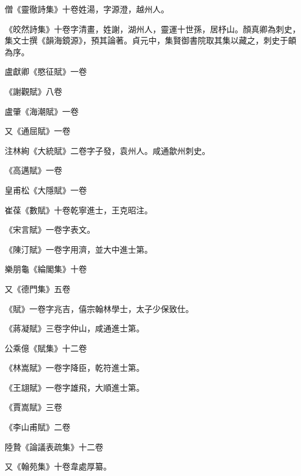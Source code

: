 \begin{pinyinscope}
 僧《靈徹詩集》十卷姓湯，字源澄，越州人。



 《皎然詩集》十卷字清畫，姓謝，湖州人，靈運十世孫，居杼山。顏真卿為刺史，集文士撰《韻海鏡源》，預其論著。貞元中，集賢御書院取其集以藏之，刺史于頔為序。



 盧獻卿《愍征賦》一卷



 《謝觀賦》八卷



 盧肇《海潮賦》一卷



 又《通屈賦》一卷



 注林絢《大統賦》二卷字子發，袁州人。咸通歙州刺史。



 《高邁賦》一卷



 皇甫松《大隱賦》一卷



 崔葆《數賦》十卷乾寧進士，王克昭注。



 《宋言賦》一卷字表文。



 《陳汀賦》一卷字用濟，並大中進士第。



 樂朋龜《綸閣集》十卷



 又《德門集》五卷



 《賦》一卷字兆吉，僖宗翰林學士，太子少保致仕。



 《蔣凝賦》三卷字仲山，咸通進士第。



 公乘億《賦集》十二卷



 《林嵩賦》一卷字降臣，乾符進士第。



 《王翃賦》一卷字雄飛，大順進士第。



 《賈嵩賦》三卷



 《李山甫賦》二卷



 陸贄《論議表疏集》十二卷



 又《翰苑集》十卷韋處厚纂。




\end{pinyinscope}
